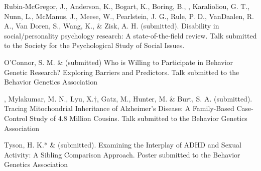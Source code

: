 

\item Rubin-McGregor, J., Anderson, K., Bogart, K., Boring, B., \meb, Karalioliou, G. T., Nunn, L., McManus, J., Meese, W., Pearlstein, J. G., Rule, P. D., VanDaalen, R. A., Van Doren, S., Wang, K., \& Zisk, A. H. (submitted). Disability in social/personality psychology research: A state-of-the-field review. Talk submitted to the Society for the Psychological Study of Social Issues. 

\item O'Connor, S. M. \& \meb (submitted) Who is Willing to Participate in Behavior Genetic Research? Exploring Barriers and Predictors. Talk submitted to the Behavior Genetics Association
\item \meb, Mylakumar, M. N., Lyu, X.$\dagger$, Gatz, M., Hunter, M. \& Burt, S. A. (submitted). Tracing Mitochondrial Inheritance of Alzheimer's Disease: A Family-Based Case-Control Study of 4.8 Million Cousins. Talk submitted to the Behavior Genetics Association
\item Tyson, H. K.* \& \meb (submitted). Examining the Interplay of ADHD and Sexual Activity: A Sibling Comparison Approach. Poster submitted to the Behavior Genetics Association




